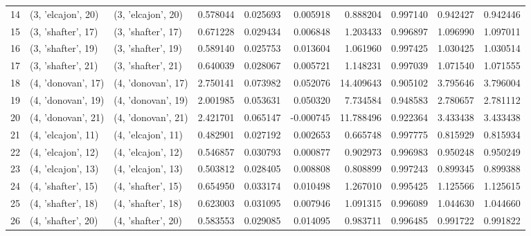 \begin{tabular}{lllrrrrrrr}
14 &  (3, 'elcajon', 20) &  (3, 'elcajon', 20) &  0.578044 &  0.025693 &  0.005918 &   0.888204 &  0.997140 &  0.942427 &  0.942446 \\
15 &  (3, 'shafter', 17) &  (3, 'shafter', 17) &  0.671228 &  0.029434 &  0.006848 &   1.203433 &  0.996897 &  1.096990 &  1.097011 \\
16 &  (3, 'shafter', 19) &  (3, 'shafter', 19) &  0.589140 &  0.025753 &  0.013604 &   1.061960 &  0.997425 &  1.030425 &  1.030514 \\
17 &  (3, 'shafter', 21) &  (3, 'shafter', 21) &  0.640039 &  0.028067 &  0.005721 &   1.148231 &  0.997039 &  1.071540 &  1.071555 \\
18 &  (4, 'donovan', 17) &  (4, 'donovan', 17) &  2.750141 &  0.073982 &  0.052076 &  14.409643 &  0.905102 &  3.795646 &  3.796004 \\
19 &  (4, 'donovan', 19) &  (4, 'donovan', 19) &  2.001985 &  0.053631 &  0.050320 &   7.734584 &  0.948583 &  2.780657 &  2.781112 \\
20 &  (4, 'donovan', 21) &  (4, 'donovan', 21) &  2.421701 &  0.065147 & -0.000745 &  11.788496 &  0.922364 &  3.433438 &  3.433438 \\
21 &  (4, 'elcajon', 11) &  (4, 'elcajon', 11) &  0.482901 &  0.027192 &  0.002653 &   0.665748 &  0.997775 &  0.815929 &  0.815934 \\
22 &  (4, 'elcajon', 12) &  (4, 'elcajon', 12) &  0.546857 &  0.030793 &  0.000877 &   0.902973 &  0.996983 &  0.950248 &  0.950249 \\
23 &  (4, 'elcajon', 13) &  (4, 'elcajon', 13) &  0.503812 &  0.028405 &  0.008808 &   0.808899 &  0.997243 &  0.899345 &  0.899388 \\
24 &  (4, 'shafter', 15) &  (4, 'shafter', 15) &  0.654950 &  0.033174 &  0.010498 &   1.267010 &  0.995425 &  1.125566 &  1.125615 \\
25 &  (4, 'shafter', 18) &  (4, 'shafter', 18) &  0.623003 &  0.031095 &  0.007946 &   1.091315 &  0.996089 &  1.044630 &  1.044660 \\
26 &  (4, 'shafter', 20) &  (4, 'shafter', 20) &  0.583553 &  0.029085 &  0.014095 &   0.983711 &  0.996485 &  0.991722 &  0.991822 \\
\bottomrule
\end{tabular}
